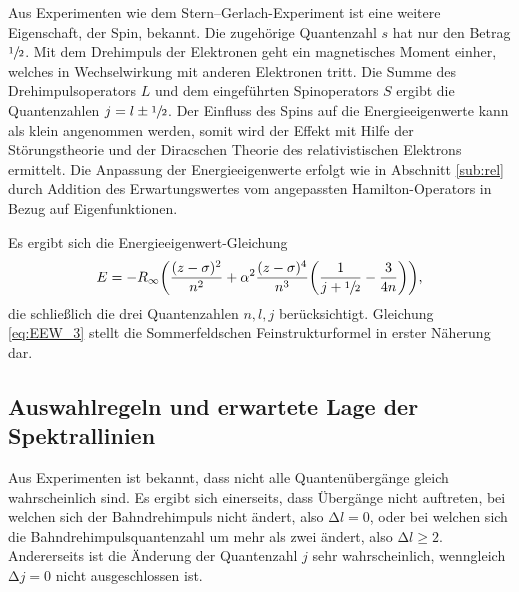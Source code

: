 
Aus Experimenten wie dem Stern--Gerlach-Experiment ist eine weitere Eigenschaft, der Spin, bekannt.
Die zugehörige Quantenzahl $s$ hat nur den Betrag $\sfrac{1}{2}$.
Mit dem Drehimpuls der Elektronen geht ein magnetisches Moment einher, welches in Wechselwirkung mit anderen Elektronen tritt.
Die Summe %
des Drehimpulsoperators $L$ und dem eingeführten Spinoperators $S$ ergibt die Quantenzahlen
$j=l\pm\sfrac{1}{2}$.
Der Einfluss des Spins auf die Energieeigenwerte kann als klein angenommen werden, somit wird der Effekt mit Hilfe der Störungstheorie und der Diracschen Theorie des relativistischen Elektrons ermittelt.
Die Anpassung der Energieeigenwerte erfolgt wie in Abschnitt \ref{sub:rel} durch Addition des Erwartungswertes vom angepassten Hamilton-Operators in Bezug auf Eigenfunktionen.

Es ergibt sich die Energieeigenwert-Gleichung
\begin{equation}
	E=-R_\infty\biggl(\frac{(z-\sigma)^2}{n^2}+\alpha^2\frac{(z-\sigma)^4}{n^3}\biggl(\frac{1}{j+\sfrac{1}{2}}-\frac{3}{4n}\biggr) \biggr),
	\label{eq:EEW_3}
\end{equation}
die schließlich die drei Quantenzahlen $n,l,j$ berücksichtigt.
Gleichung \eqref{eq:EEW_3} stellt die Sommerfeldschen Feinstrukturformel in erster Näherung dar.

\subsection{Auswahlregeln und erwartete Lage der Spektrallinien}
Aus Experimenten ist bekannt, dass nicht alle Quantenübergänge gleich wahrscheinlich sind.
Es ergibt sich einerseits, dass Übergänge nicht auftreten, bei welchen sich der Bahndrehimpuls nicht ändert, also $\mathup\Delta l=0$, oder bei welchen sich  die Bahndrehimpulsquantenzahl um mehr als zwei ändert, also $\mathup\Delta l\ge2$.
Andererseits ist die Änderung der Quantenzahl $j$ sehr wahrscheinlich, wenngleich $\mathup\Delta j=0$ nicht ausgeschlossen ist.

